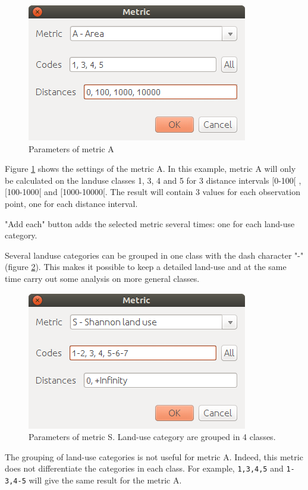 \documentclass{report}
\begin{document}
\begin{figure}[H]
	\includegraphics[scale=0.5]{img/metric_param-en.png} 
	\caption{Parameters of metric A}
	\label{metric_param_dlg}
\end{figure}

Figure \ref{metric_param_dlg} shows the settings of the metric A. In this example, metric A will only be calculated on the landuse classes 1, 3, 4 and 5 for 3 distance intervals [0-100[ , [100-1000[ and [1000-10000[. The result will contain 3 values for each observation point, one for each distance interval.

"Add each" button adds the selected metric several times: one for each land-use category.

Several landuse categories can be grouped in one class with the dash character "-" (figure \ref{metric_param_group_dlg}). This makes it possible to keep a detailed land-use and at the same time carry out some analysis on more general classes.

\begin{figure}[H]
	\includegraphics[scale=0.5]{img/metric_param_group-en.png} 
	\caption{Parameters of metric S. Land-use category are grouped in 4 classes.}
	\label{metric_param_group_dlg}
\end{figure}

The grouping of land-use categories is not useful for metric A. Indeed, this metric does not differentiate the categories in each class. For example, \verb|1,3,4,5| and \verb|1-3,4-5| will give the same result for the metric A.
\end{document}
